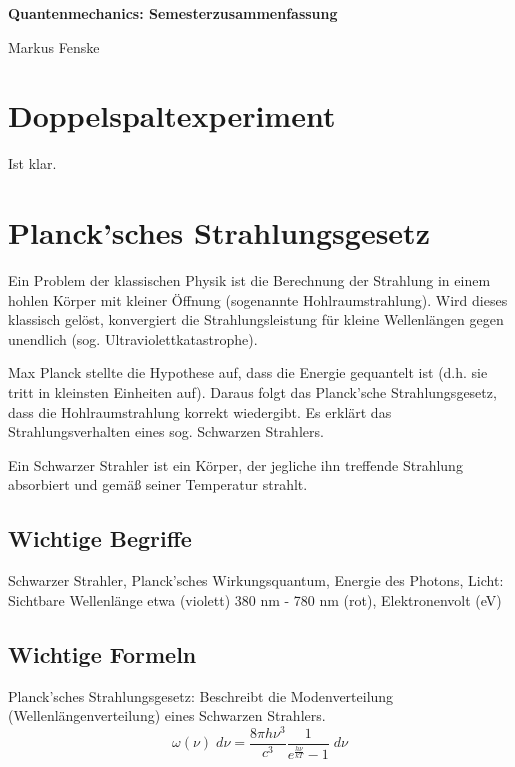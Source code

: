 \documentclass[a4paper,german,12pt,smallheadings]{scrartcl}
\begin{document}
\begin{center}
\bfseries %
\sffamily %
\vspace{-40pt}
Quantenmechanics: Semesterzusammenfassung

Markus Fenske
\vspace{-10pt}
\end{center}

\section{Doppelspaltexperiment}

Ist klar.

\section{Planck'sches Strahlungsgesetz}

Ein Problem der klassischen Physik ist die Berechnung der Strahlung in einem
hohlen Körper mit kleiner Öffnung (sogenannte Hohlraumstrahlung). Wird dieses
klassisch gelöst, konvergiert die Strahlungsleistung für kleine Wellenlängen
gegen unendlich (sog. Ultraviolettkatastrophe).

Max Planck stellte die Hypothese auf, dass die Energie gequantelt ist (d.h. sie
tritt in kleinsten Einheiten auf). Daraus folgt das Planck'sche
Strahlungsgesetz, dass die Hohlraumstrahlung korrekt wiedergibt. Es erklärt das
Strahlungsverhalten eines sog. Schwarzen Strahlers.

Ein Schwarzer Strahler ist ein Körper, der jegliche ihn treffende Strahlung
absorbiert und gemäß seiner Temperatur strahlt.

\subsection{Wichtige Begriffe} 

Schwarzer Strahler, Planck'sches Wirkungsquantum, Energie des Photons, Licht:
Sichtbare Wellenlänge etwa (violett) 380 nm - 780 nm (rot), Elektronenvolt (eV)

\subsection{Wichtige Formeln}

Planck'sches Strahlungsgesetz: Beschreibt die Modenverteilung (Wellenlängenverteilung) eines Schwarzen Strahlers.
\begin{equation}
  \omega(\nu) \; d \nu  = \frac{8 \pi h \nu^3}{c^3} \frac{1}{e^\frac{h \nu}{kT} - 1} \; d \nu
\end{equation}
\end{document}
